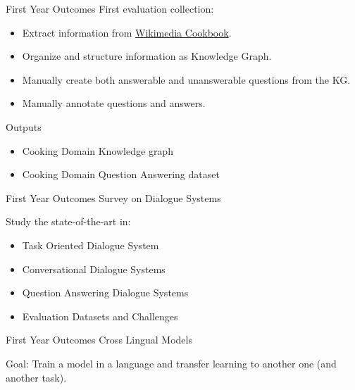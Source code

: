 \documentclass{beamer}
\begin{document}
\begin{frame}{First Year Outcomes}
  \alert{\Large First evaluation collection:} \par

  \begin{itemize}
    \item Extract information from \href{https://en.wikibooks.org/wiki/Cookbook:Table_of_Contents}{Wikimedia Cookbook}.
    \item Organize and structure information as Knowledge Graph.
    \item Manually create both answerable and unanswerable questions from the KG.
    \item Manually annotate questions and answers.
  \end{itemize}

  \begin{block}{Outputs}
    \begin{itemize}
      \item Cooking Domain Knowledge graph
      \item Cooking Domain Question Answering dataset
    \end{itemize}
  \end{block}
\end{frame}


\begin{frame}{First Year Outcomes}
  \alert{\Large Survey on Dialogue Systems} \par

  Study the state-of-the-art in:
  \begin{itemize}
    \item Task Oriented Dialogue System
    \item Conversational Dialogue Systems
    \item Question Answering Dialogue Systems
    \item Evaluation Datasets and Challenges
  \end{itemize}
\end{frame}


\begin{frame}{First Year Outcomes}
  \alert{\Large Cross Lingual Models} \par

  \alert{Goal:} Train a model in a language and transfer learning to another one (and another task).
  
\end{frame}
\end{document}
